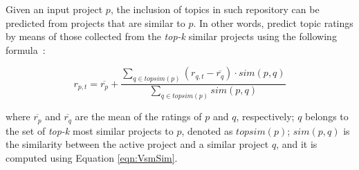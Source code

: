 



Given an input project $p$, the inclusion of topics in such repository can be predicted from projects that are similar to $p$. In other words, \TF predict topic ratings  by means of those collected from the \emph{top-k} similar projects using the following formula~\cite{NGUYEN2020110460}:

\begin{equation} \label{eqn:Prediction}
r_{p,t}=\overline{r_{p}}+\frac{\sum_{q \in topsim(p)}(r_{q,t}-\overline{r_{q}})\cdot sim(p,q) }{\sum_{q \in topsim(p)} sim(p,q) } %
\end{equation}

\noindent
where $\overline{r_{p}}$ and $\overline{r_{q}}$ are the mean of the ratings of $p$ and $q$, respectively; $q$ belongs to the set of \emph{top-k} most similar projects to $p$, denoted as $topsim(p)$; $sim(p,q)$ is the similarity between the active project and a similar project $q$, and it is computed using Equation \ref{eqn:VsmSim}. %




